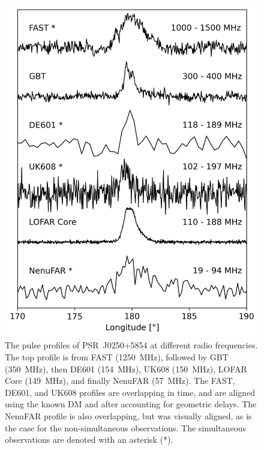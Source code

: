 \begin{figure}
    \includegraphics[width=\columnwidth]{Figures/J0250/profiles.png}
    \caption[Multifrequency profiles of PSR~J0250+5854]{The pulse profiles of PSR~J0250+5854 at different radio frequencies. The top profile is from FAST (1250~MHz), followed by GBT (350~MHz), then DE601 (154~MHz), UK608 (150~MHz), LOFAR Core (149~MHz), and finally NenuFAR (57~MHz). The FAST, DE601, and UK608 profiles are overlapping in time, and are aligned using the known DM and after accounting for geometric delays. The NenuFAR profile is also overlapping, but was visually aligned, as is the case for the non-simultaneous observations. The simultaneous observations are denoted with an asterisk (*).}
    \label{fig: profiles}
\end{figure}

